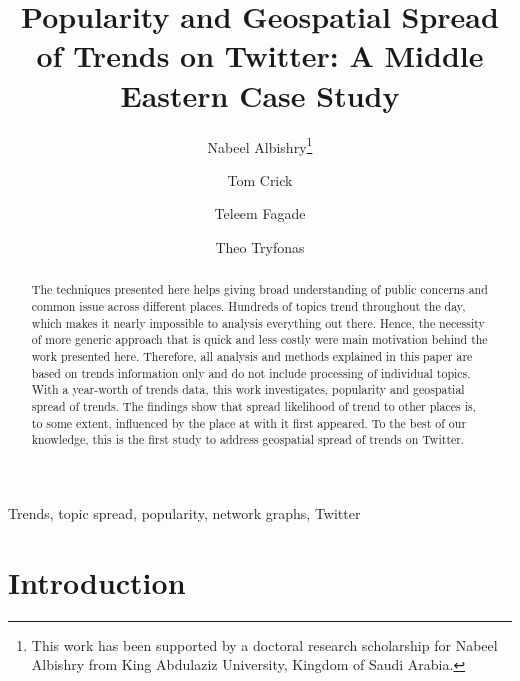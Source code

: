 \documentclass{llncs}
\begin{document}
\title{Popularity and Geospatial Spread of Trends on Twitter: A Middle
Eastern Case Study}

\author{Nabeel Albishry\thanks{This work has been supported by a doctoral research scholarship for
Nabeel Albishry from King Abdulaziz University, Kingdom of Saudi
Arabia.} \and Tom
  Crick \and Teleem Fagade \and Theo Tryfonas}


\maketitle

\begin{abstract}
The techniques presented here helps giving broad understanding of
public concerns and common issue across different places. Hundreds of
topics trend throughout the day, which makes it nearly impossible to
analysis everything out there. Hence, the necessity of more generic
approach that is quick and less costly were main motivation behind the
work presented here. Therefore, all analysis and methods explained in
this paper are based on trends information only and do not include
processing of individual topics. With a year-worth of trends data,
this work investigates, popularity and geospatial spread of
trends. The findings show that spread likelihood of trend to other
places is, to some extent, influenced by the place at with it first
appeared. To the best of our knowledge, this is the first study to
address geospatial spread of trends on Twitter.
 \end{abstract}

\begin{keywords}
Trends, topic spread, popularity, network graphs, Twitter
\end{keywords}

\section{Introduction}\label{intro}
\end{document}
